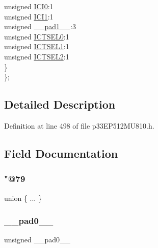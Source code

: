 \begin{DoxyCompactItemize}
\begin{tabbing}
\>\>unsigned \hyperlink{structtag_i_c1_c_o_n1_b_i_t_s_a6f1b5da2706b7c15fc8c9a01a30deaff}{ICI0}:1\\
\>\>unsigned \hyperlink{structtag_i_c1_c_o_n1_b_i_t_s_a7d5c777f0bc43f66f40462f79ed2179c}{ICI1}:1\\
\>\>unsigned \hyperlink{structtag_i_c1_c_o_n1_b_i_t_s_acaf2d0924a107ec6e8d2e31febaf66f9}{\_\_pad1\_\_}:3\\
\>\>unsigned \hyperlink{structtag_i_c1_c_o_n1_b_i_t_s_af6dd4d0e816b18462680d4b22fa926d3}{ICTSEL0}:1\\
\>\>unsigned \hyperlink{structtag_i_c1_c_o_n1_b_i_t_s_aa29140e739d886362537f87d199c4134}{ICTSEL1}:1\\
\>\>unsigned \hyperlink{structtag_i_c1_c_o_n1_b_i_t_s_a47d80892d449e6edbd5ba2ba9ff06deb}{ICTSEL2}:1\\
\>\} \\
\}; \\

\end{tabbing}\end{DoxyCompactItemize}


\subsection{Detailed Description}


Definition at line 498 of file p33\+E\+P512\+M\+U810.\+h.



\subsection{Field Documentation}
\mbox{\label{structtag_i_c1_c_o_n1_b_i_t_s_a32e8b6924c1d10fdfe95fce280415930}} 
\subsubsection{\texorpdfstring{"@79}{@79}}
{\footnotesize\ttfamily union \{ ... \} }

\mbox{\label{structtag_i_c1_c_o_n1_b_i_t_s_adf71f3d8410c1f1dbbc96680a92c49af}} 
\subsubsection{\texorpdfstring{\+\_\+\+\_\+pad0\+\_\+\+\_\+}{\_\_pad0\_\_}}
{\footnotesize\ttfamily unsigned \+\_\+\+\_\+pad0\+\_\+\+\_\+}



